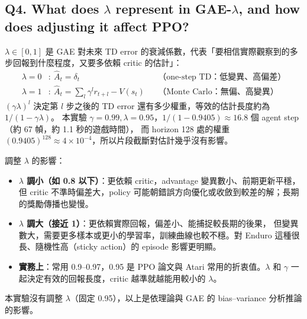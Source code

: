\documentclass[11pt,a4paper]{article}
\begin{document}
\subsection*{Q4. What does $\lambda$ represent in GAE-$\lambda$, and how does adjusting it affect PPO?}
$\lambda\in[0,1]$ 是 GAE 對未來 TD error 的衰減係數，代表「要相信實際觀察到的多步回報到什麼程度，又要多依賴 critic 的估計」：
\begin{align*}
\lambda=0&:\ \hat A_t=\delta_t &&\text{（one-step TD：低變異、高偏差）}\\
\lambda=1&:\ \hat A_t=\textstyle\sum_l\gamma^l r_{t+l}-V(s_t) &&\text{（Monte Carlo：無偏、高變異）}
\end{align*}
$(\gamma\lambda)^l$ 決定第 $l$ 步之後的 TD error 還有多少權重，等效的估計長度約為 $1/(1-\gamma\lambda)$。
本實驗 $\gamma=0.99,\lambda=0.95$，$1/(1-0.9405)\approx16.8$ 個 agent step（約 67 幀，約 1.1 秒的遊戲時間），
而 horizon 128 處的權重 $(0.9405)^{128}\approx4\times10^{-4}$，所以片段截斷對估計幾乎沒有影響。

調整 $\lambda$ 的影響：
\begin{itemize}[leftmargin=1.2em]
  \item \textbf{$\lambda$ 調小（如 0.8 以下）}：更依賴 critic，advantage 變異數小、前期更新平穩，
        但 critic 不準時偏差大，policy 可能朝錯誤方向優化或收斂到較差的解；長期的獎勵傳播也變慢。
  \item \textbf{$\lambda$ 調大（接近 1）}：更依賴實際回報，偏差小、能捕捉較長期的後果，
        但變異數大，需要更多樣本或更小的學習率，訓練曲線也較不穩。對 Enduro 這種很長、隨機性高（sticky action）的 episode 影響更明顯。
  \item \textbf{實務上}：常用 0.9--0.97，0.95 是 PPO 論文與 Atari 常用的折衷值。$\lambda$ 和 $\gamma$ 一起決定有效的回報長度，critic 越準就越能用較小的 $\lambda$。
\end{itemize}
本實驗沒有調整 $\lambda$（固定 0.95），以上是依理論與 GAE 的 bias--variance 分析推論的影響。

\end{document}
